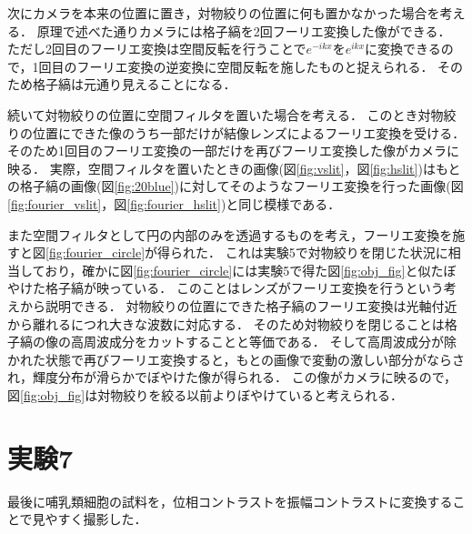 \documentclass[titlepage]{jsarticle}
\begin{document}
次にカメラを本来の位置に置き，対物絞りの位置に何も置かなかった場合を考える．
原理で述べた通りカメラには格子縞を2回フーリエ変換した像ができる．
ただし2回目のフーリエ変換は空間反転を行うことで$e^{-ikx}$を$e^{ikx}$に変換できるので，1回目のフーリエ変換の逆変換に空間反転を施したものと捉えられる．
そのため格子縞は元通り見えることになる．

続いて対物絞りの位置に空間フィルタを置いた場合を考える．
このとき対物絞りの位置にできた像のうち一部だけが結像レンズによるフーリエ変換を受ける．
そのため1回目のフーリエ変換の一部だけを再びフーリエ変換した像がカメラに映る．
実際，空間フィルタを置いたときの画像(図\ref{fig:vslit}，図\ref{fig:hslit})はもとの格子縞の画像(図\ref{fig:20blue})に対してそのようなフーリエ変換を行った画像(図\ref{fig:fourier_vslit}，図\ref{fig:fourier_hslit})と同じ模様である．

また空間フィルタとして円の内部のみを透過するものを考え，フーリエ変換を施すと図\ref{fig:fourier_circle}が得られた．
これは実験5で対物絞りを閉じた状況に相当しており，確かに図\ref{fig:fourier_circle}には実験5で得た図\ref{fig:obj_fig}と似たぼやけた格子縞が映っている．
このことはレンズがフーリエ変換を行うという考えから説明できる．
対物絞りの位置にできた格子縞のフーリエ変換は光軸付近から離れるにつれ大きな波数に対応する．
そのため対物絞りを閉じることは格子縞の像の高周波成分をカットすることと等価である．
そして高周波成分が除かれた状態で再びフーリエ変換すると，もとの画像で変動の激しい部分がならされ，輝度分布が滑らかでぼやけた像が得られる．
この像がカメラに映るので，図\ref{fig:obj_fig}は対物絞りを絞る以前よりぼやけていると考えられる．

\section{実験7}
最後に哺乳類細胞の試料を，位相コントラストを振幅コントラストに変換することで見やすく撮影した．
\end{document}
